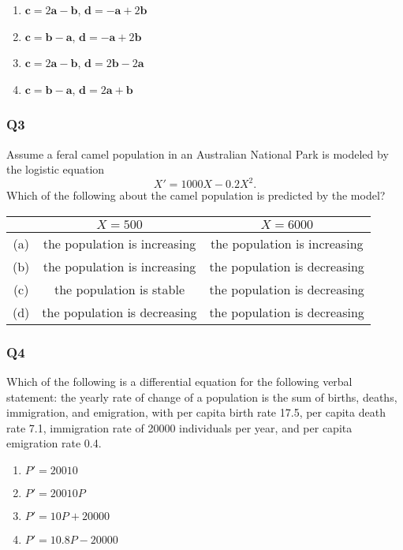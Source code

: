 \documentclass[12pt,a4paper]{article}
\newcommand{\bfa}{\mathbf{a}}
\newcommand{\bfb}{\mathbf{b}}
\newcommand{\bfc}{\mathbf{c}}
\newcommand{\bfd}{\mathbf{d}}
\begin{document}
\begin{enumerate}[label=(\alph*)]
\item $\bfc = 2\bfa - \bfb$, $\bfd = -\bfa + 2\bfb$
\item $\bfc = \bfb - \bfa$, $\bfd = -\bfa + 2\bfb$
\item $\bfc = 2\bfa - \bfb$, $\bfd = 2\bfb - 2\bfa$
\item $\bfc = \bfb - \bfa$, $\bfd = 2\bfa + \bfb$
\end{enumerate}

\newpage

\subsubsection*{Q3}
Assume a feral camel population in an Australian National Park is modeled by the logistic equation
\[
	X' = 1000X - 0.2X^2.
\]
Which of the following about the camel population is predicted by the model?

\begin{table}[ht!]
	\centering
	\begin{tabular}{|c|c|c|}
	\hline
	& $X = 500$ & $X = 6000$ \\
	\hline
	(a) & the population is increasing & the population is increasing \\
	\hline
	(b) & the population is increasing & the population is decreasing \\
	\hline
	(c) & the population is stable & the population is decreasing \\
	\hline
	(d) & the population is decreasing & the population is decreasing \\
	\hline
	\end{tabular}
\end{table}

\subsubsection*{Q4}
Which of the following is a differential equation for the following verbal statement: the yearly rate of change of a population is the sum of births, deaths, immigration, and emigration, with per capita birth rate 17.5, per capita death rate 7.1, immigration rate of 20000 individuals per year, and per capita emigration rate 0.4.

\begin{enumerate}[label=(\alph*)]
\item $P' = 20010$
\item $P' = 20010P$
\item $P' = 10P + 20000$
\item $P' = 10.8P - 20000$
\end{enumerate}
\end{document}
